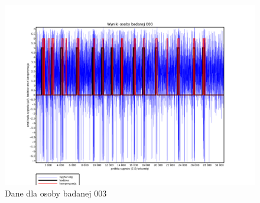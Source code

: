 \documentclass{article}
\begin{document}
        \begin{figure}
            \hspace*{-4.5cm} 
            \vspace*{1.5cm} 
            \includegraphics[width=\linewidth+10cm]{../plotting_data/scilab_eeg_01_sub_003.pdf}
            \caption{Dane dla osoby badanej 003}
        \end{figure}
\end{document}

